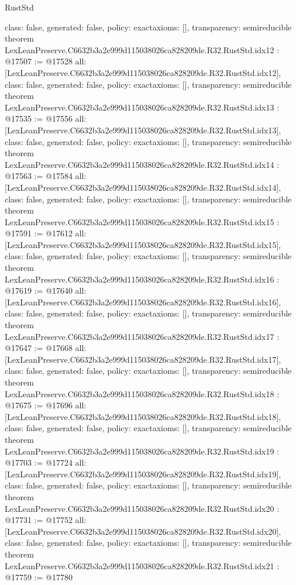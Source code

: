 \begin{lexlean}{RustStd}
\begin{coremodule}
{  class: false,
  generated: false,
  policy: exact{axioms: []},
  transparency: semireducible
}
theorem LexLeanPreserve.C6632b3a2e999d115038026ca828209de.R32.RustStd.idx12 : @17507 := @17528 {
  all: [LexLeanPreserve.C6632b3a2e999d115038026ca828209de.R32.RustStd.idx12],
  class: false,
  generated: false,
  policy: exact{axioms: []},
  transparency: semireducible
}
theorem LexLeanPreserve.C6632b3a2e999d115038026ca828209de.R32.RustStd.idx13 : @17535 := @17556 {
  all: [LexLeanPreserve.C6632b3a2e999d115038026ca828209de.R32.RustStd.idx13],
  class: false,
  generated: false,
  policy: exact{axioms: []},
  transparency: semireducible
}
theorem LexLeanPreserve.C6632b3a2e999d115038026ca828209de.R32.RustStd.idx14 : @17563 := @17584 {
  all: [LexLeanPreserve.C6632b3a2e999d115038026ca828209de.R32.RustStd.idx14],
  class: false,
  generated: false,
  policy: exact{axioms: []},
  transparency: semireducible
}
theorem LexLeanPreserve.C6632b3a2e999d115038026ca828209de.R32.RustStd.idx15 : @17591 := @17612 {
  all: [LexLeanPreserve.C6632b3a2e999d115038026ca828209de.R32.RustStd.idx15],
  class: false,
  generated: false,
  policy: exact{axioms: []},
  transparency: semireducible
}
theorem LexLeanPreserve.C6632b3a2e999d115038026ca828209de.R32.RustStd.idx16 : @17619 := @17640 {
  all: [LexLeanPreserve.C6632b3a2e999d115038026ca828209de.R32.RustStd.idx16],
  class: false,
  generated: false,
  policy: exact{axioms: []},
  transparency: semireducible
}
theorem LexLeanPreserve.C6632b3a2e999d115038026ca828209de.R32.RustStd.idx17 : @17647 := @17668 {
  all: [LexLeanPreserve.C6632b3a2e999d115038026ca828209de.R32.RustStd.idx17],
  class: false,
  generated: false,
  policy: exact{axioms: []},
  transparency: semireducible
}
theorem LexLeanPreserve.C6632b3a2e999d115038026ca828209de.R32.RustStd.idx18 : @17675 := @17696 {
  all: [LexLeanPreserve.C6632b3a2e999d115038026ca828209de.R32.RustStd.idx18],
  class: false,
  generated: false,
  policy: exact{axioms: []},
  transparency: semireducible
}
theorem LexLeanPreserve.C6632b3a2e999d115038026ca828209de.R32.RustStd.idx19 : @17703 := @17724 {
  all: [LexLeanPreserve.C6632b3a2e999d115038026ca828209de.R32.RustStd.idx19],
  class: false,
  generated: false,
  policy: exact{axioms: []},
  transparency: semireducible
}
theorem LexLeanPreserve.C6632b3a2e999d115038026ca828209de.R32.RustStd.idx20 : @17731 := @17752 {
  all: [LexLeanPreserve.C6632b3a2e999d115038026ca828209de.R32.RustStd.idx20],
  class: false,
  generated: false,
  policy: exact{axioms: []},
  transparency: semireducible
}
theorem LexLeanPreserve.C6632b3a2e999d115038026ca828209de.R32.RustStd.idx21 : @17759 := @17780 {
}
\end{coremodule}
\end{lexlean}

